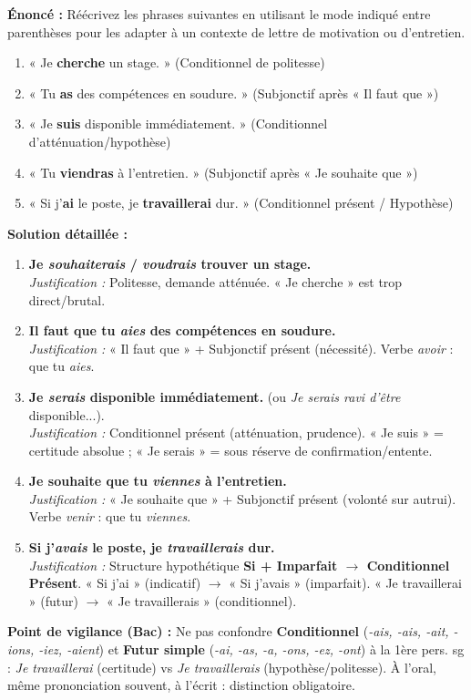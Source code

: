 \documentclass[11pt]{article}
\begin{document}
\begin{exoresolu}
\textbf{Énoncé :} Réécrivez les phrases suivantes en utilisant le mode indiqué entre parenthèses pour les adapter à un contexte de lettre de motivation ou d'entretien.
\begin{enumerate}
    \item « Je \textbf{cherche} un stage. » (Conditionnel de politesse)
    \item « Tu \textbf{as} des compétences en soudure. » (Subjonctif après « Il faut que »)
    \item « Je \textbf{suis} disponible immédiatement. » (Conditionnel d'atténuation/hypothèse)
    \item « Tu \textbf{viendras} à l'entretien. » (Subjonctif après « Je souhaite que »)
    \item « Si j'\textbf{ai} le poste, je \textbf{travaillerai} dur. » (Conditionnel présent / Hypothèse)
\end{enumerate}
\tcblower
\textbf{Solution détaillée :}

\begin{enumerate}
    \item \textbf{Je \emph{souhaiterais} / \emph{voudrais} trouver un stage.} \\
    \textit{Justification :} Politesse, demande atténuée. « Je cherche » est trop direct/brutal.
    \item \textbf{Il faut que tu \emph{aies} des compétences en soudure.} \\
    \textit{Justification :} « Il faut que » + Subjonctif présent (nécessité). Verbe \emph{avoir} : que tu \emph{aies}.
    \item \textbf{Je \emph{serais} disponible immédiatement.} (ou \emph{Je \emph{serais} ravi d'être} disponible...). \\
    \textit{Justification :} Conditionnel présent (atténuation, prudence). « Je suis » = certitude absolue ; « Je serais » = sous réserve de confirmation/entente.
    \item \textbf{Je souhaite que tu \emph{viennes} à l'entretien.} \\
    \textit{Justification :} « Je souhaite que » + Subjonctif présent (volonté sur autrui). Verbe \emph{venir} : que tu \emph{viennes}.
    \item \textbf{Si j'\emph{avais} le poste, je \emph{travaillerais} dur.} \\
    \textit{Justification :} Structure hypothétique \textbf{Si + Imparfait $\to$ Conditionnel Présent}. « Si j'ai » (indicatif) $\to$ « Si j'avais » (imparfait). « Je travaillerai » (futur) $\to$ « Je travaillerais » (conditionnel).
\end{enumerate}

\textbf{Point de vigilance (Bac) :} Ne pas confondre \textbf{Conditionnel} (\emph{-ais, -ais, -ait, -ions, -iez, -aient}) et \textbf{Futur simple} (\emph{-ai, -as, -a, -ons, -ez, -ont}) à la 1ère pers. sg : \emph{Je travaillerai} (certitude) vs \emph{Je travaillerais} (hypothèse/politesse). À l'oral, même prononciation souvent, à l'écrit : distinction obligatoire.
\end{exoresolu}
\end{document}
